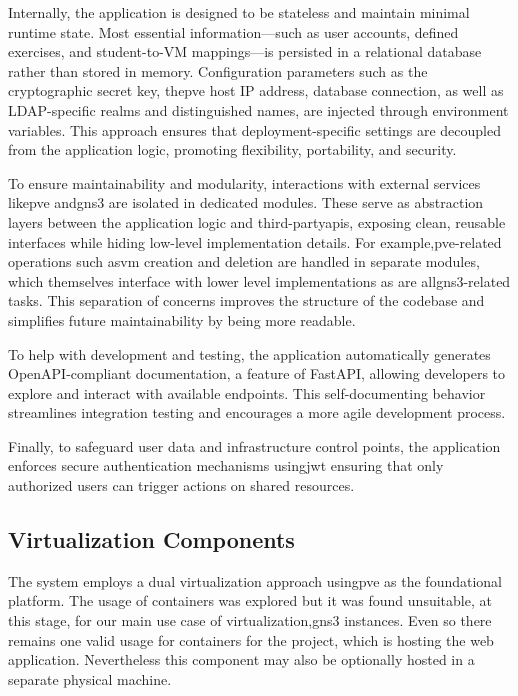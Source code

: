         Internally, the application is designed to be stateless and maintain minimal runtime state.  Most essential information—such 
        as user accounts, defined exercises, and student-to-VM mappings—is persisted in a relational database rather than stored in 
        memory. Configuration parameters such as the cryptographic secret key, the\ac{pve} host IP address, database connection, as 
        well as LDAP-specific realms and distinguished names, are injected through environment variables. This approach ensures that 
        deployment-specific settings are decoupled from the application logic, promoting flexibility, portability, and security.

        To ensure maintainability and modularity, interactions with external services like\ac{pve} and\ac{gns3} are isolated in 
        dedicated modules. These serve as abstraction layers between the application logic and third-party\ac{api}s, exposing clean, 
        reusable interfaces while hiding low-level implementation details. For example,\ac{pve}-related operations such as\ac{vm} 
        creation and deletion are handled in separate modules, which themselves interface with lower level 
        implementations as are all\ac{gns3}-related tasks. This separation of concerns improves 
        the structure of the codebase and simplifies future maintainability by being more readable.

        To help with development and testing, the application automatically generates OpenAPI-compliant documentation, a feature of FastAPI, 
        allowing developers to explore and interact with available endpoints. This self-documenting behavior streamlines integration 
        testing and encourages a more agile development process.

        Finally, to safeguard user data and infrastructure control points, the application enforces secure authentication mechanisms 
        using\ac{jwt} ensuring that only authorized users can trigger actions on shared resources.

    \subsection{Virtualization Components}

        The system employs a dual virtualization approach using\ac{pve} as the foundational platform. The usage of containers was 
        explored but it was found unsuitable, at this stage, for our main use case of virtualization,\ac{gns3} instances. Even so there remains one valid 
        usage for containers for the project, which is hosting the web application. Nevertheless this component may also be optionally hosted in 
        a separate physical machine.

